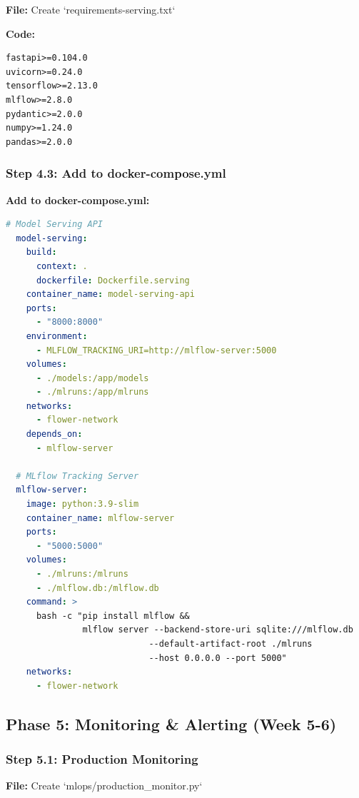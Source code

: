 \documentclass[12pt]{article}
\begin{document}
\textbf{File:} Create `requirements-serving.txt`

\textbf{Code:}
\begin{lstlisting}[language=text]
fastapi>=0.104.0
uvicorn>=0.24.0
tensorflow>=2.13.0
mlflow>=2.8.0
pydantic>=2.0.0
numpy>=1.24.0
pandas>=2.0.0
\end{lstlisting}

\subsubsection{Step 4.3: Add to docker-compose.yml}

\textbf{Add to docker-compose.yml:}
\begin{lstlisting}[language=YAML]
  # Model Serving API
  model-serving:
    build:
      context: .
      dockerfile: Dockerfile.serving
    container_name: model-serving-api
    ports:
      - "8000:8000"
    environment:
      - MLFLOW_TRACKING_URI=http://mlflow-server:5000
    volumes:
      - ./models:/app/models
      - ./mlruns:/app/mlruns
    networks:
      - flower-network
    depends_on:
      - mlflow-server

  # MLflow Tracking Server
  mlflow-server:
    image: python:3.9-slim
    container_name: mlflow-server
    ports:
      - "5000:5000"
    volumes:
      - ./mlruns:/mlruns
      - ./mlflow.db:/mlflow.db
    command: >
      bash -c "pip install mlflow &&
               mlflow server --backend-store-uri sqlite:///mlflow.db
                            --default-artifact-root ./mlruns
                            --host 0.0.0.0 --port 5000"
    networks:
      - flower-network
\end{lstlisting}

\subsection{Phase 5: Monitoring \& Alerting (Week 5-6)}

\subsubsection{Step 5.1: Production Monitoring}

\textbf{File:} Create `mlops/production_monitor.py`
\end{document}
